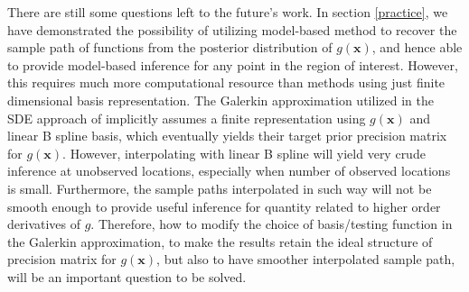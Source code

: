 \documentclass{article}
\begin{document}
There are still some questions left to the future's work. In section \ref{practice}, we have demonstrated the possibility of utilizing model-based method to recover the sample path of functions from the posterior distribution of $g(\boldsymbol{x})$, and hence able to provide model-based inference for any point in the region of interest. However, this requires much more computational resource than methods using just finite dimensional basis representation. The Galerkin approximation utilized in the SDE approach of \cite{rw2} implicitly assumes a finite representation using $g(\boldsymbol{x})$ and linear B spline basis, which eventually yields their target prior precision matrix for $g(\boldsymbol{x})$. However, interpolating with linear B spline will yield very crude inference at unobserved locations, especially when number of observed locations is small. Furthermore, the sample paths interpolated in such way will not be smooth enough to provide useful inference for quantity related to higher order derivatives of $g$. Therefore, how to modify the choice of basis/testing function in the Galerkin approximation, to make the results retain the ideal structure of precision matrix for $g(\boldsymbol{x})$, but also to have smoother interpolated sample path, will be an important question to be solved.








\newpage


\end{document}
